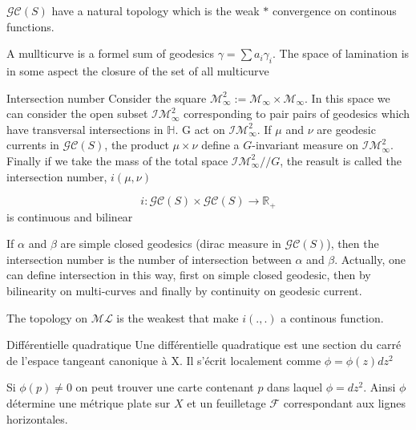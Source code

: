 \begin{rmq}
$\mathcal{GC}(S)$ have a natural topology which is the weak $*$ convergence on continous functions.
\end{rmq}

\begin{rmq}
A mullticurve is a formel sum of geodesics $\gamma = \sum a_i \gamma_i$. The space of lamination is in some aspect the closure of the set of all multicurve
\end{rmq}

\begin{dfnt}{Intersection number}
Consider the square $\mathcal{M}_\infty^2 := \mathcal{M}_\infty \times \mathcal{M}_\infty $. In this space we can consider the open subset $\mathcal{IM}^2_\infty$ corresponding to pair pairs of geodesics which have transversal intersections in $\mathbb{H}$. G act on $\mathcal{IM}^2_\infty$.
If $\mu$ and $\nu$ are geodesic currents in $\mathcal{GC}(S)$, the product $\mu \times \nu$ define a $G$-invariant measure on $\mathcal{IM}^2_\infty$.
Finally if we take the mass of the total space $\mathcal{IM}^2_\infty // G$, the reasult is called the intersection number, $i(\mu,\nu)$
\end{dfnt}

\begin{prop}
\[
i: \mathcal{GC}(S) \times \mathcal{GC}(S) \to \mathbb{R}_+
\]
is continuous and bilinear
\end{prop}

\begin{rmq}
If $\alpha$ and $\beta$ are simple closed geodesics (dirac measure in $\mathcal{GC}(S)$), then the intersection number is the number of intersection between $\alpha$ and $\beta$.
Actually, one can define intersection in this way, first on simple closed geodesic, then by bilinearity on multi-curves and finally by continuity on geodesic current.
\end{rmq}

\begin{rmq}
The topology on $\mathcal{ML}$ is the weakest that make $i(.,.)$ a continous function.
\end{rmq}

\begin{dfnt}{Différentielle quadratique}
Une différentielle quadratique est une section du carré de l'espace tangeant canonique à X. Il s'écrit localement comme $\phi= \phi(z) dz^2$
\end{dfnt}

\begin{rmq}
Si $\phi(p) \neq 0$ on peut trouver une carte contenant $p$ dans laquel $\phi = dz^2$.
Ainsi $\phi$ détermine une métrique plate sur $X$ et un feuilletage $\mathcal{F}$ correspondant aux lignes horizontales.
\end{rmq}

